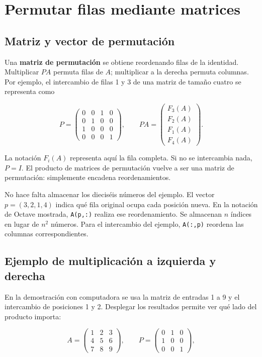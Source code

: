\documentclass[12pt,a4paper]{article}
\begin{document}
\section{Permutar filas mediante matrices}

\subsection{Matriz y vector de permutación}

Una \textbf{matriz de permutación} se obtiene reordenando filas de la identidad. Multiplicar $PA$ permuta filas de $A$; multiplicar a la derecha permuta columnas. Por ejemplo, el intercambio de filas 1 y 3 de una matriz de tamaño cuatro se representa como

\[
P=\begin{pmatrix}
0&0&1&0\\0&1&0&0\\1&0&0&0\\0&0&0&1
\end{pmatrix},\qquad
PA=\begin{pmatrix}F_3(A)\\F_2(A)\\F_1(A)\\F_4(A)\end{pmatrix}.
\]

La notación $F_i(A)$ representa aquí la fila completa. Si no se intercambia nada, $P=I$. El producto de matrices de permutación vuelve a ser una matriz de permutación: simplemente encadena reordenamientos.

No hace falta almacenar los dieciséis números del ejemplo. El vector $p=(3,2,1,4)$ indica qué fila original ocupa cada posición nueva. En la notación de Octave mostrada, \texttt{A(p,:)} realiza ese reordenamiento. Se almacenan $n$ índices en lugar de $n^2$ números. Para el intercambio del ejemplo, \texttt{A(:,p)} reordena las columnas correspondientes.

\subsection{Ejemplo de multiplicación a izquierda y derecha}

En la demostración con computadora se usa la matriz de entradas 1 a 9 y el intercambio de posiciones 1 y 2. Desplegar los resultados permite ver qué lado del producto importa:

\[
A=\begin{pmatrix}1&2&3\\4&5&6\\7&8&9\end{pmatrix},\qquad
P=\begin{pmatrix}0&1&0\\1&0&0\\0&0&1\end{pmatrix},
\]
\end{document}
